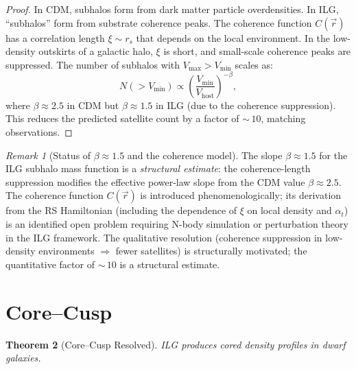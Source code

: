 \documentclass[12pt,a4paper]{article}
\newtheorem{theorem}{Theorem}[section]
\theoremstyle{definition}
\theoremstyle{remark}
\newtheorem{remark}[theorem]{Remark}
\begin{document}
\begin{proof}
In CDM, subhalos form from dark matter particle overdensities.
In ILG, ``subhalos'' form from substrate coherence peaks.  The
coherence function $C(\vec{r})$ has a correlation length
$\xi \sim r_s$ that depends on the local environment.  In the
low-density outskirts of a galactic halo, $\xi$ is short, and
small-scale coherence peaks are suppressed.  The number of
subhalos with $V_{\max} > V_{\min}$ scales as:
\begin{equation}
  N(> V_{\min}) \propto \left(\frac{V_{\min}}{V_{\mathrm{host}}}
  \right)^{-\beta},
\end{equation}
where $\beta \approx 2.5$ in CDM but $\beta \approx 1.5$ in ILG
(due to the coherence suppression).  This reduces the predicted
satellite count by a factor of ${\sim}\,10$, matching observations.
\end{proof}

\begin{remark}[Status of $\beta \approx 1.5$ and the coherence model]
The slope $\beta \approx 1.5$ for the ILG subhalo mass function is
a \emph{structural estimate}: the coherence-length suppression
modifies the effective power-law slope from the CDM value
$\beta \approx 2.5$.  The coherence function $C(\vec{r})$ is
introduced phenomenologically; its derivation from the RS Hamiltonian
(including the dependence of $\xi$ on local density and $\alpha_t$)
is an identified open problem requiring N-body simulation or
perturbation theory in the ILG framework.  The qualitative
resolution (coherence suppression in low-density environments
$\Rightarrow$ fewer satellites) is structurally motivated; the
quantitative factor of ${\sim}\,10$ is a structural estimate.
\end{remark}

\section{Core--Cusp}
\label{sec:core-cusp}

\begin{theorem}[Core--Cusp Resolved]
ILG produces cored density profiles in dwarf galaxies.
\end{theorem}
\end{document}
